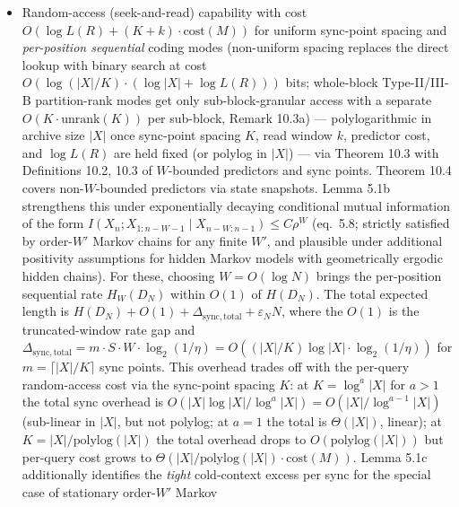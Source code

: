 \documentclass[
]{article}
\begin{document}
\begin{itemize}
  reducing reproducibility from a software-engineering question to a
  conformance specification. Published low-precision-training methods
  (integer SGD, signSGD, integer Adam, integer-quantized inference)
  are candidate components but their conformance against the full
  specification on any specific hardware target requires implementation
  and testing.
\item
  Random-access (seek-and-read) capability with cost
  $O(\log L(R) + (K + k) \cdot \mathrm{cost}(M))$ for uniform
  sync-point spacing and \emph{per-position sequential} coding
  modes (non-uniform spacing replaces the direct lookup with binary
  search at cost
  $O(\log(|X|/K) \cdot (\log |X| + \log L(R)))$ bits;
  whole-block Type-II/III-B partition-rank modes get only
  sub-block-granular access with a separate
  $O(K \cdot \mathrm{unrank}(K))$ per sub-block, Remark 10.3a)
  --- polylogarithmic in archive size $|X|$ once sync-point spacing
  $K$, read window $k$, predictor cost, and $\log L(R)$ are held
  fixed (or polylog in $|X|$) --- via Theorem 10.3 with Definitions
  10.2, 10.3 of $W$-bounded predictors and sync points.
  Theorem 10.4 covers non-$W$-bounded predictors via state snapshots.
  Lemma 5.1b strengthens this under exponentially decaying
  conditional mutual information of the form
  $I(X_n; X_{1:n-W-1} \mid X_{n-W:n-1}) \leq C \rho^W$ (eq.\ 5.8;
  strictly satisfied by order-$W'$ Markov chains for any finite
  $W'$, and plausible under additional positivity assumptions for
  hidden Markov models with geometrically ergodic hidden chains).
  For these, choosing $W = O(\log N)$ brings the per-position
  sequential rate $H_W(D_N)$ within $O(1)$ of $H(D_N)$. The total
  expected length is $H(D_N) + O(1) + \Delta_{\mathrm{sync,total}} +
  \varepsilon_N N$, where the $O(1)$ is the truncated-window rate
  gap and $\Delta_{\mathrm{sync,total}} = m \cdot S \cdot W \cdot
  \log_2(1/\eta) = O((|X|/K) \log |X| \cdot \log_2(1/\eta))$ for
  $m = \lceil |X|/K \rceil$ sync points. This overhead trades off
  with the per-query random-access cost via the sync-point spacing
  $K$: at $K = \log^a |X|$ for $a > 1$ the total sync overhead is
  $O(|X| \log |X|/\log^a |X|) = O(|X|/\log^{a-1} |X|)$ (sub-linear
  in $|X|$, but not polylog; at $a = 1$ the total is $\Theta(|X|)$,
  linear); at $K = |X|/\mathrm{polylog}(|X|)$ the total overhead
  drops to $O(\mathrm{polylog}(|X|))$ but per-query cost grows to
  $\Theta(|X|/\mathrm{polylog}(|X|) \cdot \mathrm{cost}(M))$.
  Lemma 5.1c additionally identifies the \emph{tight} cold-context
  excess per sync for the special case of stationary order-$W'$ Markov

\end{itemize}
\end{document}
